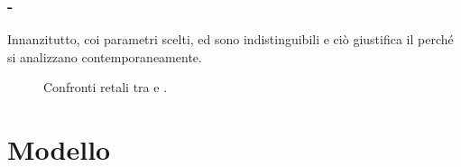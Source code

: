 \documentclass[11pt]{beamer}
\begin{document}
            \begin{frame}\frametitle{\insertpart{} - \insertsection{}}
                Innanzitutto, coi parametri scelti, \FKdiscrete{} ed \HDdiscrete{} sono indistinguibili e ciò giustifica il perché si analizzano contemporaneamente.
                \begin{figure}[h!]
                    \centering
                        \resizebox{!}{.75\textheight}{}
                    \caption{Confronti retali tra \FKdiscrete{} e \HDdiscrete{}.}
                \end{figure}
            \end{frame}

            



        \section{Modello \texorpdfstring{\SMOdiscrete{}}{SMO}}
\end{document}
